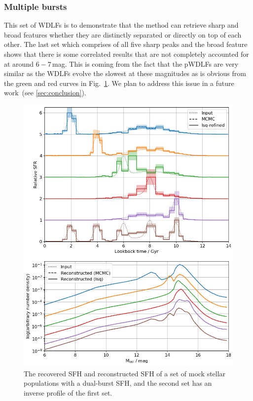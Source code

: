 \documentclass[fleqn,usenatbib]{mnras}
\begin{document}
\subsubsection*{Multiple bursts}
This set of WDLFs is to demonstrate that the method can retrieve sharp and
broad features whether they are distinctly separated or directly on top of each
other. The last set which comprises of all five sharp peaks and the broad
feature shows that there is some correlated results that are not completely
accounted for at around $6-7$\,mag. This is coming from the fact that the
pWDLFs are very similar as the WDLFs evolve the slowest at these magnitudes as
is obvious from the green and red curves in Fig.~\ref{fig:bursts_sfh}. We plan
to address this issue in a future work~(see \ref{sec:conclusion}).

\begin{figure}
  \includegraphics[width=\columnwidth]{figures/fig_02_two_bursts_wdlf.png} 
  \caption{The recovered SFH and reconstructed SFH of a set of mock stellar
  populations with a dual-burst SFH, and the second set has an inverse profile
  of the first set.}
  \label{fig:bursts_sfh}
\end{figure}
\end{document}
